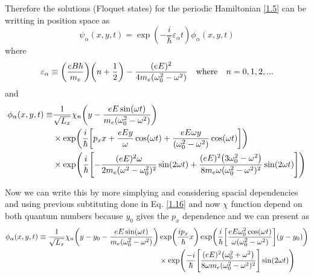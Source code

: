 \vspace{5mm}
\noindent
Therefore the solutions (Floquet states) for the periodic Hamiltonian \eqref{1.5} can be writting in position space as
\begin{equation} \label{3.17}
  \psi_{\alpha}(x,y,t) =
  \exp(-\frac{i}{\hbar}\varepsilon_{\alpha}t)   \phi_{\alpha} (x,y,t)
\end{equation}
where
\begin{equation} \label{3.18}
  \varepsilon_{\alpha} \equiv
  \qty(\frac{eB\hbar }{m_e})\qty(n + \frac{1}{2}) -
  \frac{(eE)^2}{4m_e(\omega_0^2 - \omega^2)}
  \quad \text{where} \quad
  n = 0,1,2, ...
\end{equation}
and
\begin{equation} \label{3.19}
  \begin{aligned}
    \phi_{\alpha}(x,y,t) \equiv &
    \frac{1}{\sqrt{L_x}}
    \chi_{n}\qty(y - \frac{eE\sin(\omega t)}{m_e(\omega_0^2 - \omega^2)} ) \\
    & \times
    \exp(
     \frac{i}{\hbar}\qty[
     p_x x +
     \frac{eEy}{\omega}\cos(\omega t)+
     \frac{eE\omega y }{(\omega_0^2 - \omega^2)}\cos(\omega t)
     ])\\
     & \times
     \exp(\frac{i}{\hbar}\qty[
     -\frac{(eE)^2\omega }{2m_e(\omega^2 - \omega_0^2)^2}\sin(2\omega t)
     + \frac{(eE)^2\qty(3\omega_0^2 - \omega^2)}{8m_e\omega(\omega_0^2 - \omega^2)^2} \sin(2\omega t)
  ])
  \end{aligned}
\end{equation}

\noindent
Now we can write this by more simplying and considering spacial dependencies and using previous subtituting done in Eq. \eqref{1.16} and now $\chi$ function depend on both quantum numbers because $y_0$ gives the $p_x$ dependence and we can present as
\begin{equation} \label{3.20}
  \begin{aligned}
    \phi_{\alpha}(x,y,t)  \equiv
    \frac{1}{\sqrt{L_x}}
    \chi_{n}\qty(y - y_0 - \frac{eE\sin(\omega t)}{m_e(\omega_0^2 - \omega^2)} ) &
    \exp( \frac{i p_x }{\hbar}x )
    \exp(
     \frac{i}{\hbar}
     \qty[
     \frac{eE\omega_0^2\cos(\omega t)}{\omega(\omega_0^2 - \omega^2)}]
     \qty(y - y_0 ))\\
     & \times
     \exp(\frac{-i}{\hbar}
     \qty[
     \frac{(eE)^2\qty(\omega_0^2 + \omega^2)}{8\omega m_e(\omega_0^2 - \omega^2)^2}
     ]\sin(2\omega t)
     )
  \end{aligned}
\end{equation}

